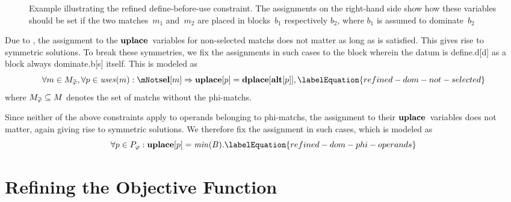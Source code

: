 \begin{figure}
  \centering%

  \caption[Example illustrating the refined define-before-use constraint]%
          {%
            Example illustrating the refined define-before-use constraint.
            The assignments on the right-hand side show how these
            variables should be set if the two matches~$m_1$ and~$m_2$ are
            placed in blocks~$b_1$ respectively $b_2$, where $b_1$ is assumed to
            dominate~$b_2$%
          }
\end{figure}

Due to , the assignment to the
$\mVar{uplace}$~\glspl{variable} for non-selected \glspl{match} does not matter
as long as  is satisfied.
%
This gives rise to symmetric \glspl{solution}.
%
To break these symmetries, we fix the assignments in such cases to the
\gls{block} wherein the \gls{datum} is \gls{define.d}[d] as a \gls{block} always
\gls{dominate.b}[s] itself.
%
This is modeled as
%
\begin{equation}
  \forall m \in \mPhiMatchCompSet,
  \forall p \in \mUses(m) :
  \mNot\mVar{sel}[m] \mImp \mVar{uplace}[p] = \mVar{dplace}[\mVar{alt}[p]],
  \labelEquation{refined-dom-not-selected}
\end{equation}
%
where \mbox{$\mPhiMatchCompSet \subseteq \mMatchSet$} denotes the set of
\glspl{match} without the \glspl{phi-match}.

Since neither of the above \glspl{constraint} apply to \glspl{operand} belonging
to \glspl{phi-match}, the assignment to their $\mVar{uplace}$~\glspl{variable}
does not matter, again giving rise to symmetric \glspl{solution}.
%
We therefore fix the assignment in such cases, which is modeled as
%
\begin{equation}
  \forall p \in \mPhiOperandSet :
  \mVar{uplace}[p] = \mMin(\mBlockSet).
  \labelEquation{refined-dom-phi-operands}
\end{equation}


\section{Refining the Objective Function}

